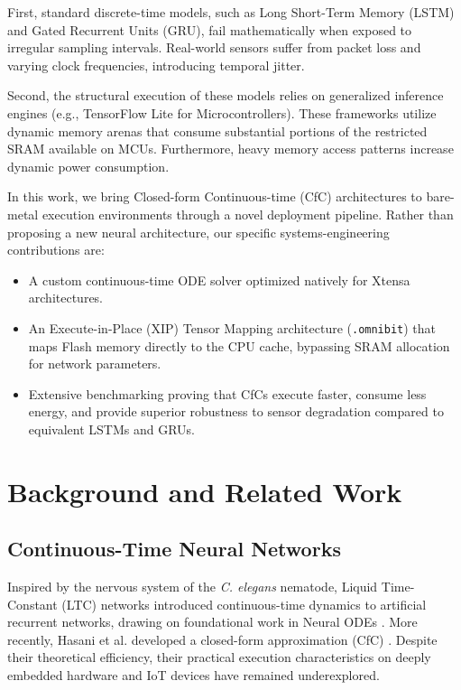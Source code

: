 \documentclass[conference]{IEEEtran}
\begin{document}
First, standard discrete-time models, such as Long Short-Term Memory (LSTM) and Gated Recurrent Units (GRU), fail mathematically when exposed to irregular sampling intervals. Real-world sensors suffer from packet loss and varying clock frequencies, introducing temporal jitter. 

Second, the structural execution of these models relies on generalized inference engines (e.g., TensorFlow Lite for Microcontrollers). These frameworks utilize dynamic memory arenas that consume substantial portions of the restricted SRAM available on MCUs. Furthermore, heavy memory access patterns increase dynamic power consumption.

In this work, we bring Closed-form Continuous-time (CfC) architectures \cite{hasani2022closed} to bare-metal execution environments through a novel deployment pipeline. Rather than proposing a new neural architecture, our specific systems-engineering contributions are:
\begin{itemize}
    \item A custom continuous-time ODE solver optimized natively for Xtensa architectures.
    \item An Execute-in-Place (XIP) Tensor Mapping architecture (\texttt{.omnibit}) that maps Flash memory directly to the CPU cache, bypassing SRAM allocation for network parameters.
    \item Extensive benchmarking proving that CfCs execute faster, consume less energy, and provide superior robustness to sensor degradation compared to equivalent LSTMs and GRUs.
\end{itemize}

\section{Background and Related Work}

\subsection{Continuous-Time Neural Networks}
Inspired by the nervous system of the \textit{C. elegans} nematode, Liquid Time-Constant (LTC) networks \cite{hasani2020liquid} introduced continuous-time dynamics to artificial recurrent networks, drawing on foundational work in Neural ODEs \cite{chen2018neuralode}. More recently, Hasani et al. developed a closed-form approximation (CfC) \cite{hasani2022closed}. Despite their theoretical efficiency, their practical execution characteristics on deeply embedded hardware and IoT devices \cite{lin2020mcunet} have remained underexplored.
\end{document}
